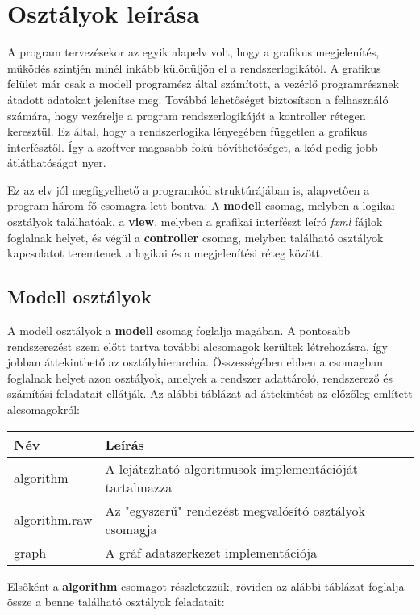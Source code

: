 \documentclass{elteikthesis}
\begin{document}
\section{Osztályok leírása}
A program tervezésekor az egyik alapelv volt, hogy a grafikus megjelenítés, működés szintjén minél inkább különüljön el a rendszerlogikától. A grafikus felület már csak a modell programész által számított, a vezérlő programrésznek átadott adatokat jelenítse meg. Továbbá lehetőséget biztosítson a felhasználó számára, hogy vezérelje a program rendszerlogikáját a kontroller rétegen keresztül. Ez által, hogy a rendszerlogika lényegében független a grafikus interfésztől. Így a szoftver magasabb fokú bővíthetőséget, a kód pedig jobb átláthatóságot nyer.\par
Ez az elv jól megfigyelhető a programkód struktúrájában is, alapvetően a program három fő csomagra lett bontva: A \textbf{modell} csomag, melyben a logikai osztályok találhatóak, a \textbf{view}, melyben a grafikai interfészt leíró \emph{fxml} fájlok foglalnak helyet, és végül a \textbf{controller} csomag, melyben található osztályok kapcsolatot teremtenek a logikai és a megjelenítési réteg között.

\subsection{Modell osztályok}
A modell osztályok a \textbf{modell} csomag foglalja magában. A pontosabb rendszerezést szem előtt tartva további alcsomagok kerültek létrehozásra, így jobban áttekinthető az osztályhierarchia. Összességében ebben a csomagban foglalnak helyet azon osztályok, amelyek a rendszer adattároló, rendszerező és számítási feladatait ellátják. Az alábbi táblázat ad áttekintést az előzőleg említett alcsomagokról:\par
\begin{table}[h]
		\def\arraystretch{2}
		\centering
	\begin{tabular}{|l|l|}
		\hline
		\textbf{Név}  & \textbf{Leírás}                                                                          \\ \hline
		algorithm     & A lejátszható algoritmusok implementációját tartalmazza                       \\ \hline
		algorithm.raw & Az "egyszerű" rendezést megvalósító osztályok csomagja\\ \hline
		graph         & A gráf adatszerkezet implementációja                           \\ \hline
	\end{tabular}
\end{table}
Elsőként a \textbf{algorithm} csomagot részletezzük, röviden az alábbi táblázat foglalja össze a benne található osztályok feladatait:
\end{document}
